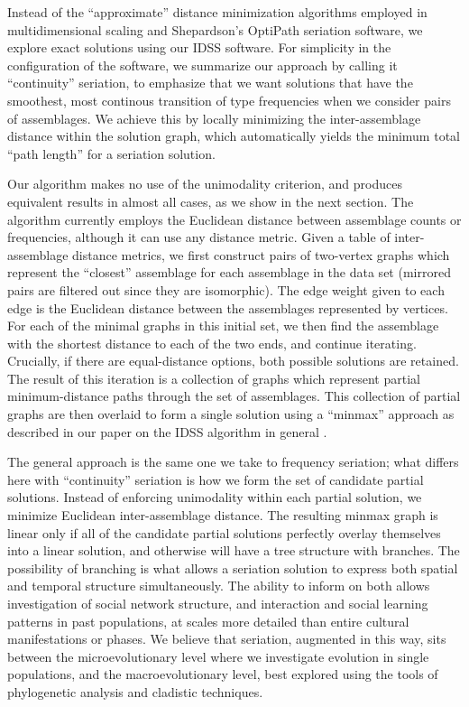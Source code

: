 \documentclass[graybox,natbib]{svmult}
\begin{document}
Instead of the ``approximate'' distance minimization algorithms employed
in multidimensional scaling and Shepardson's OptiPath seriation
software, we explore exact solutions using our IDSS software. For
simplicity in the configuration of the software, we summarize our
approach by calling it ``continuity'' seriation, to emphasize that we
want solutions that have the smoothest, most continous transition of
type frequencies when we consider pairs of assemblages. We achieve this
by locally minimizing the inter-assemblage distance within the solution
graph, which automatically yields the minimum total ``path length'' for
a seriation solution.

Our algorithm makes no use of the unimodality criterion, and produces
equivalent results in almost all cases, as we show in the next section.
The algorithm currently employs the Euclidean distance between
assemblage counts or frequencies, although it can use any distance
metric. Given a table of inter-assemblage distance metrics, we first
construct pairs of two-vertex graphs which represent the ``closest''
assemblage for each assemblage in the data set (mirrored pairs are
filtered out since they are isomorphic). The edge weight given to each
edge is the Euclidean distance between the assemblages represented by
vertices. For each of the minimal graphs in this initial set, we then
find the assemblage with the shortest distance to each of the two ends,
and continue iterating. Crucially, if there are equal-distance options,
both possible solutions are retained. The result of this iteration is a
collection of graphs which represent partial minimum-distance paths
through the set of assemblages. This collection of partial graphs are
then overlaid to form a single solution using a ``minmax'' approach as
described in our paper on the IDSS algorithm in general
\citep{lipomadsendunnell2015}.

The general approach is the same one we take to frequency seriation;
what differs here with ``continuity'' seriation is how we form the set
of candidate partial solutions. Instead of enforcing unimodality within
each partial solution, we minimize Euclidean inter-assemblage distance.
The resulting minmax graph is linear only if all of the candidate
partial solutions perfectly overlay themselves into a linear solution,
and otherwise will have a tree structure with branches. The possibility
of branching is what allows a seriation solution to express both spatial
and temporal structure simultaneously. The ability to inform on both
allows investigation of social network structure, and interaction and
social learning patterns in past populations, at scales more detailed
than entire cultural manifestations or phases. We believe that
seriation, augmented in this way, sits between the microevolutionary
level where we investigate evolution in single populations, and the
macroevolutionary level, best explored using the tools of phylogenetic
analysis and cladistic techniques.
\end{document}
